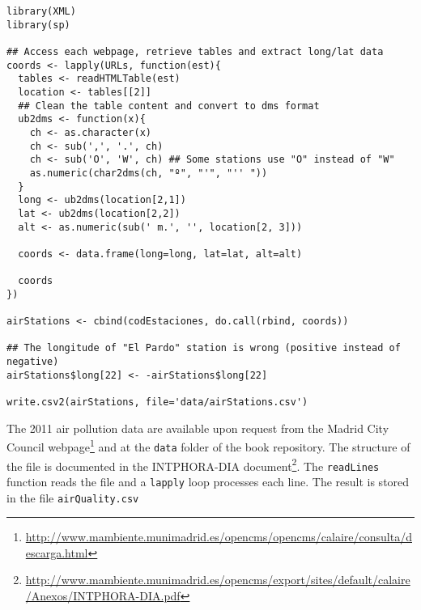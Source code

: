 
\lstset{language=R,numbers=none}
\begin{lstlisting}
library(XML)
library(sp)

## Access each webpage, retrieve tables and extract long/lat data
coords <- lapply(URLs, function(est){
  tables <- readHTMLTable(est)
  location <- tables[[2]]
  ## Clean the table content and convert to dms format
  ub2dms <- function(x){
    ch <- as.character(x)
    ch <- sub(',', '.', ch) 
    ch <- sub('O', 'W', ch) ## Some stations use "O" instead of "W"
    as.numeric(char2dms(ch, "º", "'", "'' "))
  }
  long <- ub2dms(location[2,1])
  lat <- ub2dms(location[2,2])
  alt <- as.numeric(sub(' m.', '', location[2, 3]))

  coords <- data.frame(long=long, lat=lat, alt=alt)

  coords
})

airStations <- cbind(codEstaciones, do.call(rbind, coords))

## The longitude of "El Pardo" station is wrong (positive instead of negative)
airStations$long[22] <- -airStations$long[22]

write.csv2(airStations, file='data/airStations.csv')
\end{lstlisting}

The 2011 air pollution data are available upon request from the Madrid
City Council webpage\footnote{\url{http://www.mambiente.munimadrid.es/opencms/opencms/calaire/consulta/descarga.html}} and at the \texttt{data} folder of the book
repository. The structure of the file is documented in the
INTPHORA-DIA document\footnote{\url{http://www.mambiente.munimadrid.es/opencms/export/sites/default/calaire/Anexos/INTPHORA-DIA.pdf}}. The \texttt{readLines} function reads the file
and a \texttt{lapply} loop processes each line. The result is stored in the
file \texttt{airQuality.csv}



